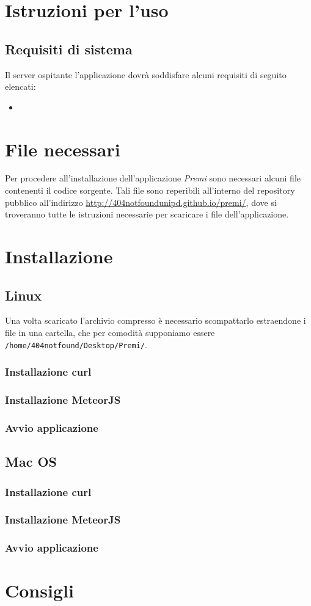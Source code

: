 \section{Istruzioni per l'uso}
\subsection{Requisiti di sistema}
Il server ospitante l'applicazione dovrà soddisfare alcuni requisiti di seguito elencati:
\begin{itemize}
\item 
\end{itemize}

\section{File necessari}
Per procedere all'installazione dell'applicazione \emph{Premi} sono necessari alcuni file contenenti il codice sorgente.
Tali file sono reperibili all'interno del repository pubblico all'indirizzo \href{http://404notfoundunipd.github.io/premi/}{http://404notfoundunipd.github.io/premi/}, dove si troveranno tutte le istruzioni necessarie per scaricare i file dell'applicazione.

\section{Installazione}
\subsection{Linux}
Una volta scaricato l'archivio compresso è necessario scompattarlo estraendone i file in una cartella, che per comodità supponiamo essere \verb+/home/404notfound/Desktop/Premi/+.
\subsubsection{Installazione curl}

\subsubsection{Installazione MeteorJS}

\subsubsection{Avvio applicazione}



\subsection{Mac OS}
\subsubsection{Installazione curl}

\subsubsection{Installazione MeteorJS}

\subsubsection{Avvio applicazione}

\section{Consigli}